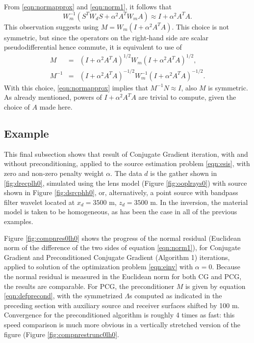 \documentclass[georeport,12pt]{geophysics}
\begin{document}
From \ref{eqn:normapprox} and \ref{eqn:norm1}, it follows that
\[
  W_m^{-1}(S^TW_dS + \alpha^2 A^TW_mA) \approx I + \alpha^2 A^TA.
\]
This observation suggests using $M=W_m(I+\alpha^2A^TA)$. This choice
is not symmetric, but since the operators on the right-hand side are
scalar pseudodifferential hence commute, it is equivalent to use of
\begin{eqnarray}
  M         &=&(I+\alpha^2A^TA)^{1/2}W_m(I+\alpha^2A^TA)^{1/2},\nonumber \\
  M^{-1}
            &=&(I+\alpha^2A^TA)^{-1/2}W_m^{-1}(I+\alpha^2A^TA)^{-1/2}.
                \label{eqn:defprecond}
\end{eqnarray}
With this choice, \ref{eqn:normapprox} implies that
$M^{-1}N \approx I$, also $M$ is symmetric. As already mentioned,
powers of $I + \alpha^2A^TA$ are trivial to compute, given the choice
of $A$ made here. 

\subsection{Example}
This final subsection shows that result of Conjugate Gradient
iteration, with and without preconditioning, applied to the source
estimation problem \ref{eqn:esis}, with zero and non-zero penalty
weight $\alpha$. The data $d$ is the gather shown in
\ref{fig:drecplh0}, simulated using the lens model (Figure \ref{fig:ooplrays0}) with source shown
in Figure \ref{fig:dsrcphh0}, or, alternatively, a point source with
bandpass filter wavelet located at $x_d=3500$ m, $z_d=3500$ m. In the inversion,
the material model is taken to be homogeneous, as has been the case in
all of the previous examples. 

Figure \ref{fig:compnres0lh0} shows the progress of the normal residual
(Euclidean norm of the difference of the two sides of equation \ref{eqn:norm1}),
for Conjugate Gradient and Preconditioned Conjugate Gradient
(Algorithm 1) iterations, applied to solution of the optimization
problem \ref{eqn:einv} with $\alpha=0$. Because the normal residual is%
measured in the Euclidean norm for both CG and PCG, the results are
comparable. For PCG, the preconditioner $M$ is given by equation
\ref{eqn:defprecond}, with the symmetrized $\Lambda$s computed as
indicated in the preceding section with auxiliary source and
receiver surfaces shifted by 100 m. Convergence for the
preconditioned algorithm is roughly 4 times as fast: this speed
comparison is much more obvious in a vertically stretched version of
the figure (Figure \ref{fig:compnrestrunc0lh0}.
\end{document}
